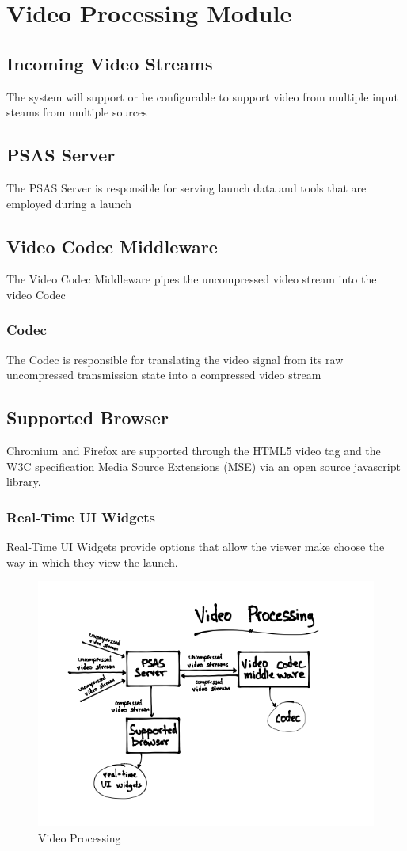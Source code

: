 \section{Video Processing Module}

\subsection{Incoming Video Streams}
The system will support or be configurable to support video from multiple input steams from multiple sources

\subsection{PSAS Server}
The PSAS Server is responsible for serving launch data and tools that are
employed during a launch

\subsection{Video Codec Middleware}
The Video Codec Middleware pipes the uncompressed video stream into the video Codec

\subsubsection{Codec}
The Codec is responsible for translating the video signal from its raw uncompressed transmission state into a compressed video stream

\subsection{Supported Browser}
Chromium and Firefox are supported through the HTML5 video tag and the W3C specification Media Source Extensions (MSE)
via an open source javascript library.

\subsubsection{Real-Time UI Widgets}
Real-Time UI Widgets provide options that allow the viewer make choose the way
in which they view the launch.

\begin{figure}
  \centering
  \includegraphics{imgs/VideoProcessing.png}
  \caption{Video Processing}
\end{figure}

